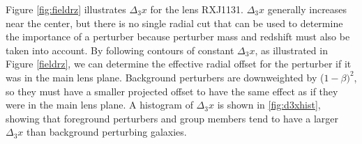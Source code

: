 Figure \ref{fig:fieldrz} illustrates $\Delta_3 x$ for the lens RXJ1131. $\Delta_3 x$ generally increases near the center, but there is no single radial cut that can be used to determine the importance of a perturber because perturber mass and redshift must also be taken into account. By following contours of constant $\Delta_3 x$, as illustrated in Figure \ref{fieldrz}, we can determine the effective radial offset for the perturber if it was in the main lens plane. Background perturbers are downweighted by ($1-\beta)^2$, so they must have a smaller projected offset to have the same effect as if they were in the main lens plane. A histogram of $\Delta_3 x$ is shown in \ref{fig:d3xhist}, showing that foreground perturbers and group members tend to have a larger $\Delta_3 x$ than background perturbing galaxies.
  
  
  
  